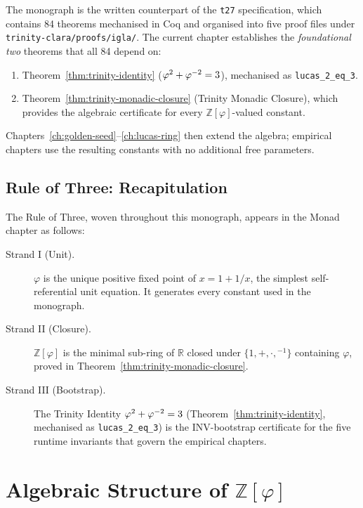 The monograph is the written counterpart of the \texttt{t27}
specification, which contains 84 theorems mechanised in Coq and
organised into five proof files under
\texttt{trinity-clara/proofs/igla/}.  The current chapter establishes
the \emph{foundational two} theorems that all 84 depend on:
\begin{enumerate}
  \item Theorem~\ref{thm:trinity-identity} ($\varphi^{2}+\varphi^{-2}=3$),
        mechanised as \texttt{lucas\_2\_eq\_3}.
  \item Theorem~\ref{thm:trinity-monadic-closure} (Trinity Monadic Closure),
        which provides the algebraic certificate for every
        $\mathbb{Z}[\varphi]$-valued constant.
\end{enumerate}
Chapters~\ref{ch:golden-seed}--\ref{ch:lucas-ring} then extend the
algebra; empirical chapters use the resulting constants with no
additional free parameters.

\subsection{Rule of Three: Recapitulation}

The Rule of Three, woven throughout this monograph, appears in the
Monad chapter as follows:
\begin{description}
  \item[Strand I (Unit).] $\varphi$ is the unique positive fixed point
    of $x = 1 + 1/x$, the simplest self-referential unit equation.
    It generates every constant used in the monograph.
  \item[Strand II (Closure).] $\mathbb{Z}[\varphi]$ is the minimal
    sub-ring of $\mathbb{R}$ closed under $\{1,+,\cdot,{}^{-1}\}$
    containing $\varphi$, proved in
    Theorem~\ref{thm:trinity-monadic-closure}.
  \item[Strand III (Bootstrap).] The Trinity Identity
    $\varphi^{2}+\varphi^{-2}=3$ (Theorem~\ref{thm:trinity-identity},
    mechanised as \texttt{lucas\_2\_eq\_3}) is the INV-bootstrap
    certificate for the five runtime invariants that govern the
    empirical chapters.
\end{description}


\section{Algebraic Structure of $\mathbb{Z}[\varphi]$}
\label{sec:monad-algebra}

